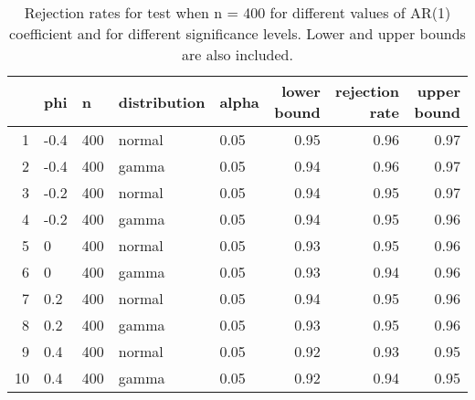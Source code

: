 \begin{table}[ht]
\centering
\caption{Rejection rates for test when n = 400 for 
                   different values of AR(1) coefficient and for different 
                   significance levels. Lower and upper bounds are also 
                   included.} 
\label{table:rr_400}
\begin{tabular}{rllllrrr}
  \hline
 & phi & n & distribution & alpha & lower bound & rejection rate & upper bound \\ 
  \hline
1 & -0.4 & 400 & normal & 0.05 & 0.95 & 0.96 & 0.97 \\ 
  2 & -0.4 & 400 & gamma & 0.05 & 0.94 & 0.96 & 0.97 \\ 
  3 & -0.2 & 400 & normal & 0.05 & 0.94 & 0.95 & 0.97 \\ 
  4 & -0.2 & 400 & gamma & 0.05 & 0.94 & 0.95 & 0.96 \\ 
  5 & 0 & 400 & normal & 0.05 & 0.93 & 0.95 & 0.96 \\ 
  6 & 0 & 400 & gamma & 0.05 & 0.93 & 0.94 & 0.96 \\ 
  7 & 0.2 & 400 & normal & 0.05 & 0.94 & 0.95 & 0.96 \\ 
  8 & 0.2 & 400 & gamma & 0.05 & 0.93 & 0.95 & 0.96 \\ 
  9 & 0.4 & 400 & normal & 0.05 & 0.92 & 0.93 & 0.95 \\ 
  10 & 0.4 & 400 & gamma & 0.05 & 0.92 & 0.94 & 0.95 \\ 
   \hline
\end{tabular}
\end{table}

